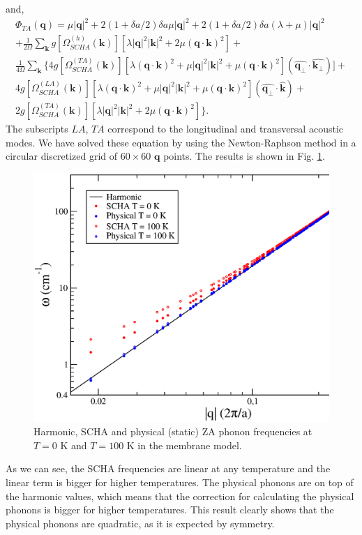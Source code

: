 and,
\begin{multline}
 \Phi_{TA}(\boldsymbol{q})=\mu|\boldsymbol{q}|^{2}+2(1+\delta a/2)\delta a\mu|\boldsymbol{q}|^{2}+2(1+\delta a/2)\delta a(\lambda+\mu)|\boldsymbol{q}|^{2}\\+\frac{1}{2\Omega}\sum_{\boldsymbol{k}}g[\Omega_{SCHA}^{
 (h)}(\boldsymbol{k})][\lambda|\boldsymbol{q}|^{2}|\boldsymbol{k}|^{2}+2\mu(\boldsymbol{q}\cdot\boldsymbol{k})^{2}]+\\\frac{1}{4\Omega}\sum_{\boldsymbol{k}}\{
 4g[\Omega_{SCHA}^{(TA)}(\boldsymbol{k})][\lambda(\boldsymbol{q}\cdot\boldsymbol{k})^{2}+\mu|\boldsymbol{q}|^{2}|\boldsymbol{k}|^{2}+\mu(\boldsymbol{q}\cdot\boldsymbol{k})^{2}](\hat{\boldsymbol{q}_{\perp}}\cdot\hat{
 \boldsymbol{k}_{\perp}})]+\\4g[\Omega_{SCHA}^{(LA)}(\boldsymbol{k})][\lambda(\boldsymbol{q}\cdot\boldsymbol{k})^{2}+\mu|\boldsymbol{q}|^{2}|\boldsymbol{k}|^{2}+\mu(\boldsymbol{q}\cdot\boldsymbol{k})^{2}](\hat{\boldsymbol{
 q}_{\perp}}\cdot\hat{\boldsymbol{k}})+ \\ 2g[\Omega_{SCHA}^{(TA)}(\boldsymbol{k})][\lambda|\boldsymbol{q}|^{2}|\boldsymbol{k}|^{2}+2\mu(\boldsymbol{q}\cdot\boldsymbol{k})^{2}]  \}.
\end{multline}
The subscripts $LA$, $TA$ correspond to the longitudinal and transversal acoustic modes. We have solved these 
equation by using the Newton-Raphson method in a circular discretized grid of $60\times60$ $\boldsymbol{q}$ 
points. The results is shown in Fig. \ref{membrane-results}. 
\begin{figure}[h]
\includegraphics[width=\linewidth]{Figures/membrane.eps}
\caption{Harmonic, SCHA and physical (static) ZA phonon frequencies at $T=0$ K and $T=100$ K in the membrane model.}
\label{membrane-results}
\end{figure}
As we can see, the SCHA frequencies are linear at any temperature and the linear term is bigger for higher 
temperatures. The physical phonons are on top of the harmonic values, which means that the correction for 
calculating the physical phonons is bigger for higher temperatures. This result clearly shows that the physical 
phonons are quadratic, as it is expected by symmetry. 
